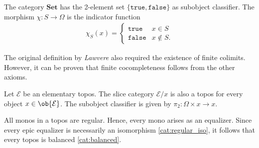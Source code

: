     \begin{example}
        The category $\mathbf{Set}$ has the 2-element set $\{\texttt{true},\texttt{false}\}$ as subobject classifier. The morphism $\chi:S\rightarrow\Omega$ is the indicator function
        \begin{gather}
            \chi_S(x)=
            \begin{cases}
                \texttt{true}&x\in S\\
                \texttt{false}&x\not\in S.
            \end{cases}
        \end{gather}
    \end{example}

    \begin{remark}
        The original definition by \textit{Lawvere} also required the existence of finite colimits. However, it can be proven that finite cocompleteness follows from the other axioms.
    \end{remark}

    \begin{theorem}
        Let $\mathcal{E}$ be an elementary topos. The slice category $\mathcal{E}/x$ is also a topos for every object $x\in\ob{\mathcal{E}}$. The subobject classifier is given by $\pi_2:\Omega\times x\rightarrow x$.
    \end{theorem}

    \begin{property}[Balanced]
        All monos in a topos are regular. Hence, every mono arises as an equalizer. Since every epic equalizer is necessarily an isomorphism \ref{cat:regular_iso}, it follows that every topos is balanced \ref{cat:balanced}.
    \end{property}

